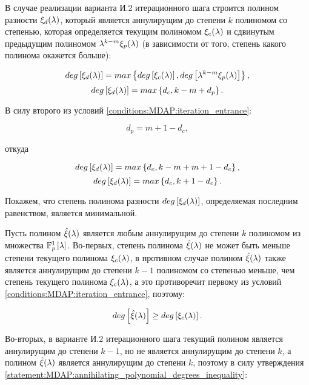 В случае реализации варианта И.2 итерационного шага строится полином разности $\xi_d (\lambda)$, который является аннулирущим до степени
$k$ полиномом со степенью, которая определяется текущим полиномом $\xi_c (\lambda)$ и сдвинутым предыдущим полиномом
$\lambda^{k-m} \xi_p (\lambda)$ (в зависимости от того, степень какого полинома окажется больше):

	$$ deg \left [ \xi_d (\lambda) \right ] = max \left \{ deg \left [ \xi_c (\lambda) \right ] , deg \left [ \lambda^{k-m}\xi_p (\lambda) \right ] \right \}, $$
	\begin{equation} \label{equation:MDAP:initial_difference_polynomial_degree_equality}
		deg \left [ \xi_d (\lambda) \right ] = max \left \{ d_c , k - m + d_p \right \}.
	\end{equation}

В силу второго из условий \ref{conditions:MDAP:iteration_entrance}:

	$$ d_p = m + 1 - d_c, $$

откуда

	$$ deg \left [ \xi_d (\lambda) \right ] = max \left \{ d_c , k - m + m + 1 - d_c \right \}, $$
	\begin{equation} \label{equation:MDAP:final_difference_polynomial_degree_equality}
		deg \left [ \xi_d (\lambda) \right ] = max \left \{ d_c , k + 1 - d_c \right \}.
	\end{equation}

Покажем, что степень полинома разности $deg \left [ \xi_d (\lambda) \right ]$, определяемая последним равенством, является минимальной.

Пусть полином $\hat\xi (\lambda)$ является любым аннулирущим до степени $k$ полиномом из множества $\mathbb{F}_p^1 \left [ \lambda \right ]$. Во-первых,
степень полинома $\hat\xi (\lambda)$ не может быть меньше степени текущего полинома $\xi_c (\lambda)$, в противном случае полином
$\hat\xi (\lambda)$ также является аннулирущим до степени $k-1$ полиномом со степенью меньше, чем степень текущего полинома
$\xi_c (\lambda)$, а это противоречит первому из условий \ref{conditions:MDAP:iteration_entrance}, поэтому:

	\begin{equation} \label{equation:MDAP:any_kth_annihilating_polynomial_monotony_threshold}
		deg \left [ \hat\xi (\lambda) \right ] \ge deg \left [ \xi_c (\lambda) \right ].
	\end{equation}

Во-вторых, в варианте И.2 итерационного шага текущий полином является аннулирущим до степени $k-1$, но не является аннулирущим до степени
$k$, а полином $\hat\xi (\lambda)$ является аннулирущим до степени $k$, поэтому в силу утверждения
\ref{statement:MDAP:annihilating_polynomial_degrees_inequality}:

